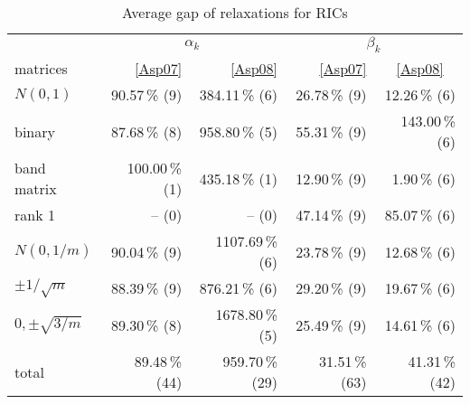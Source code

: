 \begin{table} 
 \begin{scriptsize} \caption{Average gap of relaxations for RICs} 
 \label{lhsRhsGap} 
 \begin{tabular*}{\linewidth}{@{}l@{\;\;\extracolsep{\fill}}rrrr@{}}\toprule 
  & \multicolumn{2}{c}{$\alpha_k$} & \multicolumn{2}{c}{$\beta_k$} \\ 
\cmidrule(r){2-3} \cmidrule(l){4-5} 
matrices & \eqref{Asp07} & \eqref{Asp08} & \eqref{Asp07} & \eqref{Asp08} \ 
\\ \midrule 
$N(0,1)$ & \num{90.57}\,\% (9) & \num{384.11}\,\% (6) & \num{26.78}\,\% (9) & \num{12.26}\,\% (6) \\ 
binary & \num{87.68}\,\% (8) & \num{958.80}\,\% (5) & \num{55.31}\,\% (9) & \num{143.00}\,\% (6) \\ 
band matrix & \num{100.00}\,\% (1) & \num{435.18}\,\% (1) & \num{12.90}\,\% (9) & \num{1.90}\,\% (6) \\ 
rank 1& -- (0) &-- (0) & \num{47.14}\,\% (9) & \num{85.07}\,\% (6) \\ 
$N(0,1/m)$ & \num{90.04}\,\% (9) & \num{1107.69}\,\% (6) & \num{23.78}\,\% (9) & \num{12.68}\,\% (6) \\ 
$\pm 1/\sqrt{m}$ & \num{88.39}\,\% (9) & \num{876.21}\,\% (6) & \num{29.20}\,\% (9) & \num{19.67}\,\% (6) \\ 
$0, \pm \sqrt{3/m}$ & \num{89.30}\,\% (8) & \num{1678.80}\,\% (5) & \num{25.49}\,\% (9) & \num{14.61}\,\% (6) \\ 
\midrule 
total &  \num{89.48}\,\% (44) & \num{959.70}\,\% (29) & \num{31.51}\,\% (63) & \num{41.31}\,\% (42) \\ 
\bottomrule 
 \end{tabular*} 
 \end{scriptsize} 
 \end{table} 